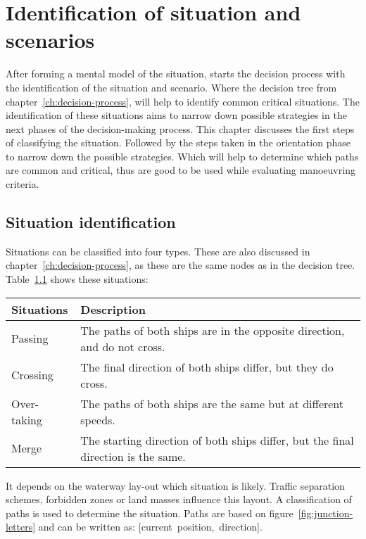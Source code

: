 \chapter{Identification of situation and scenarios}
\label{ch:identify-situation}
After forming a mental model of the situation, starts the decision process with the identification of the situation and scenario. Where the decision tree from chapter~\ref{ch:decision-process}, will help to identify common critical situations. The identification of these situations aims to narrow down possible strategies in the next phases of the decision-making process. This chapter discusses the first steps of classifying the situation. Followed by the steps taken in the orientation phase to narrow down the possible strategies. Which will help to determine which paths are common and critical, thus are good to be used while evaluating manoeuvring criteria.

\section{Situation identification}
\label{sec:situation-identification}
Situations can be classified into four types. These are also discussed in chapter~\ref{ch:decision-process}, as these are the same nodes as in the decision tree. Table~\ref{tab:situations2} shows these situations:
\begin{table}[H]
	\centering
	\begin{tabular}{p{}|p{}}
		\toprule
		Situations & Description\\
		\midrule
		Passing & The paths of both ships are in the opposite direction, and do not cross. \\
		Crossing & The final direction of both ships differ, but they do cross. \\
		Over-taking & The paths of both ships are the same but at different speeds. \\
		Merge & The starting direction of both ships differ, but the final direction is the same. \\
		\bottomrule
	\end{tabular}
	
	\label{tab:situations2}
\end{table}
It depends on the waterway lay-out which situation is likely. Traffic separation schemes, forbidden zones or land masses influence this layout. A classification of paths is used to determine the situation. Paths are based on figure~\ref{fig:junction-letters} and can be written as: [current~position,~direction].

